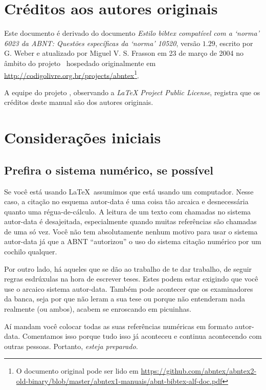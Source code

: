 \documentclass[a4paper]{ltxdoc}
\begin{document}
\section{Créditos aos autores originais}

Este documento é derivado do documento \emph{Estilo bibtex compatível com a
`norma' 6023 da ABNT: Questões específicas da `norma' 10520}, versão $ 1.29
$, escrito por G. Weber e atualizado por Miguel V. S. Frasson em 23 de março de
2004 no âmbito do projeto \abnTeX\ hospedado originalmente em
\url{http://codigolivre.org.br/projects/abntex}\footnote{O documento original pode ser lido em
\url{https://github.com/abntex/abntex2-old-binary/blob/master/abntex1-manuais/abnt-bibtex-alf-doc.pdf}}.

A equipe do projeto , observando a \emph{LaTeX Project Public License},
registra que os créditos deste manual são dos autores originais.


\section{Considerações iniciais}

\subsection{Prefira o sistema numérico, se possível}

Se você está usando \LaTeX\, assumimos que está usando um computador. Nesse
caso, a citação no esquema autor-data é uma coisa tão arcaica e desnecessária
quanto uma régua-de-cálculo. A leitura de um texto com chamadas no sistema
autor-data é desajeitada, especialmente quando muitas referências são chamadas
de uma só vez. Você não tem absolutamente nenhum motivo para usar o sistema
autor-data já que a ABNT ``autorizou'' o uso do sistema citação numérico
por um cochilo qualquer.

Por outro lado, há aqueles que se dão ao trabalho de te dar trabalho, de seguir
regras esdrúxulas na hora de escrever teses. Estes podem estar exigindo que você
use o arcaico sistema autor-data. Também pode acontecer que os examinadores da
banca, seja por que não leram a sua tese ou porque não entenderam nada
realmente (ou ambos), acabem se enroscando em picuinhas.

Aí mandam você colocar todas as suas referências numéricas em formato
autor-data. Comentamos isso porque tudo isso já aconteceu e continua acontecendo
com outras pessoas. Portanto, \emph{esteja preparado}.
\end{document}
